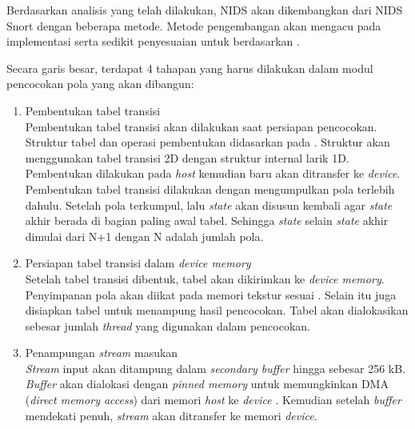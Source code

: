       Berdasarkan analisis yang telah dilakukan, NIDS akan dikembangkan dari NIDS Snort dengan beberapa metode. Metode pengembangan akan mengacu pada implementasi \cite{lin2013} serta sedikit penyesuaian untuk berdasarkan \cite{gnort2008}.
      

      Secara garis besar, terdapat 4 tahapan yang harus dilakukan dalam modul pencocokan pola yang akan dibangun:

      \begin{enumerate}

      \item
      Pembentukan tabel transisi \\
      Pembentukan tabel transisi akan dilakukan saat persiapan pencocokan. Struktur
      tabel dan operasi pembentukan didasarkan pada \cite{lin2013}. Struktur akan
      menggunakan tabel transisi 2D dengan struktur internal larik 1D. Pembentukan dilakukan pada \emph{host} kemudian baru akan ditransfer ke \emph{device}. Pembentukan tabel transisi dilakukan dengan mengumpulkan pola terlebih dahulu. Setelah pola terkumpul, lalu \emph{state} akan disusun kembali agar \emph{state} akhir berada di bagian paling awal tabel. Sehingga \emph{state} selain \emph{state} akhir dimulai dari N+1 dengan N adalah jumlah pola. 

      \item
      Persiapan tabel transisi dalam \emph{device memory} \\
      Setelah tabel transisi dibentuk, tabel akan dikirimkan ke \emph{device memory}. Penyimpanan pola akan diikat pada memori tekstur sesuai \cite{lin2013}. Selain itu juga disiapkan tabel untuk menampung hasil pencocokan. Tabel akan dialokasikan sebesar jumlah \emph{thread} yang digunakan dalam pencocokan.

      \item
      Penampungan \emph{stream} masukan \\
      \emph{Stream} input akan ditampung dalam \emph{secondary buffer} hingga sebesar 256 kB. \emph{Buffer} akan dialokasi dengan \emph{pinned memory} untuk memungkinkan DMA (\emph{direct memory access}) dari memori \emph{host} ke \emph{device} \citep{gnort2008}. Kemudian setelah \emph{buffer} mendekati penuh, \emph{stream} akan ditransfer ke memori \emph{device}.


\end{enumerate}
